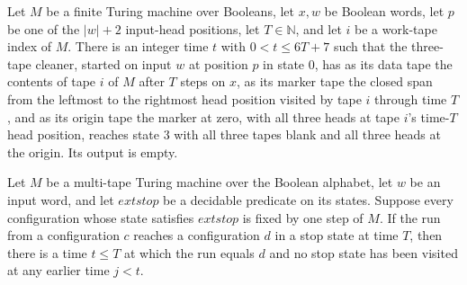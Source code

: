 \begin{lemma}
\label{Turing.FinTM.emCall_track_clearable}
\leanok
{}
Let $M$ be a finite Turing machine over Booleans, let $x,w$ be Boolean words, let $p$ be
one of the $|w|+2$ input-head positions, let $T\in\mathbb{N}$, and let $i$ be a
work-tape index of $M$. There is an integer time $t$ with $0<t\le 6T+7$ such that the
three-tape cleaner, started on input $w$ at position $p$ in state $0$, has as its data
tape the contents of tape $i$ of $M$ after $T$ steps on $x$, as its marker tape the
closed span from the leftmost to the rightmost head position visited by tape $i$ through
time $T$, and as its origin tape the marker at zero, with all three heads at tape $i$'s
time-$T$ head position, reaches state $3$ with all three tapes blank and all three heads
at the origin. Its output is empty.
\end{lemma}

\begin{lemma}
\label{Turing.FinTM.emCall_first_entry}
\leanok
{}
Let $M$ be a multi-tape Turing machine over the Boolean alphabet, let $w$ be an input
word, and let $	ext{stop}$ be a decidable predicate on its states. Suppose every
configuration whose state satisfies $	ext{stop}$ is fixed by one step of $M$. If the run
from a configuration $c$ reaches a configuration $d$ in a stop state at time $T$, then
there is a time $t\le T$ at which the run equals $d$ and no stop state has been visited
at any earlier time $j<t$.
\end{lemma}

